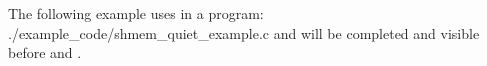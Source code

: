 \begin{apidefinition}
\begin{apiexamples}

\apicexample
    {The following example uses    in a \CorCpp{} program: }	 
    {./example_code/shmem_quiet_example.c}
    { and  will be completed and visible before 
    and .}
\end{apiexamples}

\end{apidefinition}
